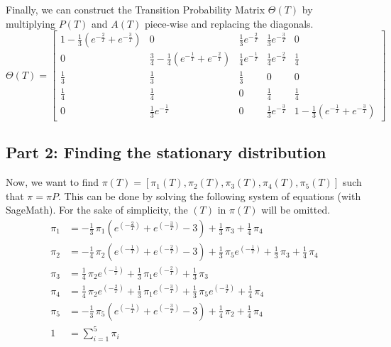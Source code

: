 Finally, we can construct the Transition Probability Matrix \(\Theta(T)\) by multiplying \(P(T)\) and \(A(T)\) piece-wise and replacing the diagonals.
\[
    \Theta(T) = \begin{bmatrix}
        1 - \frac{1}{3}\left(e^{-\frac2T} + e^{-\frac3T}\right) & 0 & \frac{1}{3}e^{-\frac2T} & \frac{1}{3}e^{-\frac3T} & 0 \\
        0 & \frac{3}{4} - \frac{1}{4}\left(e^{-\frac1T} + e^{-\frac2T}\right) & \frac{1}{4}e^{-\frac1T} & \frac14e^{-\frac2T} & \frac14 \\
        \frac13 & \frac13 & \frac13 & 0 & 0 \\
        \frac14 & \frac14 & 0 & \frac14 & \frac14 \\
        0 & \frac13e^{-\frac1T} & 0 & \frac13e^{-\frac3T} & 1 - \frac{1}{3}\left(e^{-\frac1T} + e^{-\frac3T}\right)
    \end{bmatrix}
\]

\subsection*{Part 2: Finding the stationary distribution}

Now, we want to find \(\pi(T) = [\pi_1(T), \pi_2(T), \pi_3(T), \pi_4(T), \pi_5(T)]\) such that \(\pi = \pi P\). This can be done by solving the following system of equations (with SageMath). For the sake of simplicity, the \((T)\) in \(\pi(T)\) will be omitted.
\[
\begin{aligned}
    \pi_1 &= -\frac{1}{3} \, \pi_{1} {\left(e^{\left(-\frac{2}{T}\right)} + e^{\left(-\frac{3}{T}\right)} - 3\right)} + \frac{1}{3} \, \pi_{3} + \frac{1}{4} \, \pi_{4} \\
    \pi_2 &= -\frac{1}{4} \, \pi_{2} {\left(e^{\left(-\frac{1}{T}\right)} + e^{\left(-\frac{2}{T}\right)} - 3\right)} + \frac{1}{3} \, \pi_{5} e^{\left(-\frac{1}{T}\right)} + \frac{1}{3} \, \pi_{3} + \frac{1}{4} \, \pi_{4} \\
    \pi_3 &= \frac{1}{4} \, \pi_{2} e^{\left(-\frac{1}{T}\right)} + \frac{1}{3} \, \pi_{1} e^{\left(-\frac{2}{T}\right)} + \frac{1}{3} \, \pi_{3} \\
    \pi_4 &= \frac{1}{4} \, \pi_{2} e^{\left(-\frac{2}{T}\right)} + \frac{1}{3} \, \pi_{1} e^{\left(-\frac{3}{T}\right)} + \frac{1}{3} \, \pi_{5} e^{\left(-\frac{3}{T}\right)} + \frac{1}{4} \, \pi_{4} \\
    \pi_5 &= -\frac{1}{3} \, \pi_{5} {\left(e^{\left(-\frac{1}{T}\right)} + e^{\left(-\frac{3}{T}\right)} - 3\right)} + \frac{1}{4} \, \pi_{2} + \frac{1}{4} \, \pi_{4} \\
    1 &= \sum_{i=1}^5 \pi_i
\end{aligned}
\]

